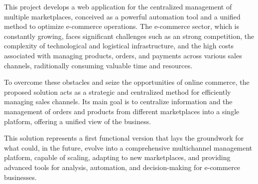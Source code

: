 This project develops a web application for the centralized management of multiple marketplaces, conceived as a powerful automation tool and a unified method to optimize e-commerce operations. The e-commerce sector, which is constantly growing, faces significant challenges such as an strong competition, the complexity of technological and logistical infrastructure, and the high costs associated with managing products, orders, and payments across various sales channels, raditionally consuming valuable time and resources.

To overcome these obstacles and seize the opportunities of online commerce, the proposed solution acts as a strategic and centralized method for efficiently managing sales channels. Its main goal is to centralize information and the management of orders and products from different marketplaces into a single platform, offering a unified view of the business.

This solution represents a first functional version that lays the groundwork for what could, in the future, evolve into a comprehensive multichannel management platform, capable of scaling, adapting to new marketplaces, and providing advanced tools for analysis, automation, and decision-making for e-commerce businesses.